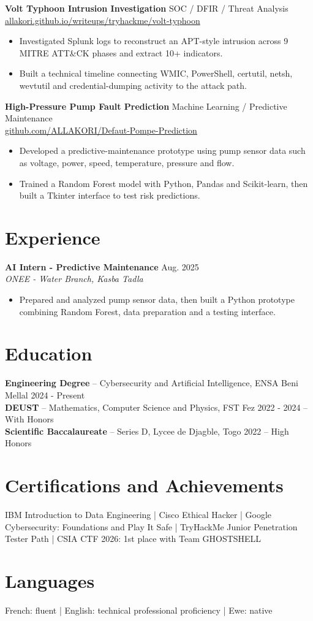 \documentclass[10pt,a4paper]{article}
\newcommand{\role}[3]{%
  \textbf{#1} \hfill #3\\
  \textit{#2}\vspace{1pt}
}
\newcommand{\edu}[4]{%
  \textbf{#1} -- #2 \hfill #3 #4\\[-1pt]
}
\begin{document}
\textbf{Volt Typhoon Intrusion Investigation} \hfill SOC / DFIR / Threat Analysis\\
\href{https://allakori.github.io/writeups/posts/volt-typhoon-intrusion/}{allakori.github.io/writeups/tryhackme/volt-typhoon}
\begin{itemize}
  \item Investigated Splunk logs to reconstruct an APT-style intrusion across 9 MITRE ATT\&CK phases and extract 10+ indicators.
  \item Built a technical timeline connecting WMIC, PowerShell, certutil, netsh, wevtutil and credential-dumping activity to the attack path.
\end{itemize}

\textbf{High-Pressure Pump Fault Prediction} \hfill Machine Learning / Predictive Maintenance\\
\href{https://github.com/ALLAKORI/Defaut-Pompe-Prediction}{github.com/ALLAKORI/Defaut-Pompe-Prediction}
\begin{itemize}
  \item Developed a predictive-maintenance prototype using pump sensor data such as voltage, power, speed, temperature, pressure and flow.
  \item Trained a Random Forest model with Python, Pandas and Scikit-learn, then built a Tkinter interface to test risk predictions.
\end{itemize}

\section{Experience}
\role{AI Intern - Predictive Maintenance}{ONEE - Water Branch, Kasba Tadla}{Aug. 2025}
\begin{itemize}
  \item Prepared and analyzed pump sensor data, then built a Python prototype combining Random Forest, data preparation and a testing interface.
\end{itemize}

\section{Education}
\edu{Engineering Degree}{Cybersecurity and Artificial Intelligence, ENSA Beni Mellal}{2024 - Present}{}
\edu{DEUST}{Mathematics, Computer Science and Physics, FST Fez}{2022 - 2024}{-- With Honors}
\edu{Scientific Baccalaureate}{Series D, Lycee de Djagble, Togo}{2022}{-- High Honors}

\section{Certifications and Achievements}
IBM Introduction to Data Engineering | Cisco Ethical Hacker | Google Cybersecurity: Foundations and Play It Safe | TryHackMe Junior Penetration Tester Path | CSIA CTF 2026: 1st place with Team GHOSTSHELL

\section{Languages}
French: fluent | English: technical professional proficiency | Ewe: native
\end{document}
